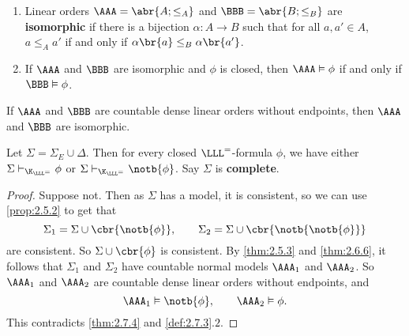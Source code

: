 \begin{definition}
\label{def:2.7.3}
\hfill
\begin{enumerate}
\item Linear orders $ \AAA = \abr{A; \le_A} $ and $ \BBB = \abr{B; \le_B} $ are \textbf{isomorphic} if there is a bijection $ \alpha : A \to B $ such that for all $ a, a' \in A $, $ a \le_A a' $ if and only if $ \alpha\br{a} \le_B \alpha\br{a'} $.
\item If $ \AAA $ and $ \BBB $ are isomorphic and $ \phi $ is closed, then $ \AAA \vDash \phi $ if and only if $ \BBB \vDash \phi $.
\end{enumerate}
\end{definition}

\begin{theorem}[Cantor]
\label{thm:2.7.4}
If $ \AAA $ and $ \BBB $ are countable dense linear orders without endpoints, then $ \AAA $ and $ \BBB $ are isomorphic.
\end{theorem}

\begin{lemma}
\label{lem:2.7.5}
Let $ \Sigma = \Sigma_E \cup \Delta $. Then for every closed $ \LLL^= $-formula $ \phi $, we have either $ \Sigma \vdash_{\K_{\LLL^=}} \phi $ or $ \Sigma \vdash_{\K_{\LLL^=}} \notb{\phi} $. Say $ \Sigma $ is \textbf{complete}.
\end{lemma}

\begin{proof}
Suppose not. Then as $ \Sigma $ has a model, it is consistent, so we can use \ref{prop:2.5.2} to get that
$$ \Sigma_1 = \Sigma \cup \cbr{\notb{\phi}}, \qquad \Sigma_2 = \Sigma \cup \cbr{\notb{\notb{\phi}}} $$
are consistent. So $ \Sigma \cup \cbr{\phi} $ is consistent. By \ref{thm:2.5.3} and \ref{thm:2.6.6}, it follows that $ \Sigma_1 $ and $ \Sigma_2 $ have countable normal models $ \AAA_1 $ and $ \AAA_2 $. So $ \AAA_1 $ and $ \AAA_2 $ are countable dense linear orders without endpoints, and
$$ \AAA_1 \vDash \notb{\phi}, \qquad \AAA_2 \vDash \phi. $$
This contradicts \ref{thm:2.7.4} and \ref{def:2.7.3}.$ 2 $.
\end{proof}

